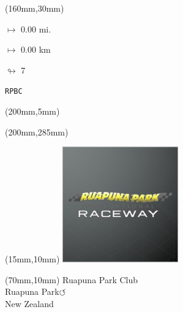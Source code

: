 \begin{textblock*}{40mm}(160mm,30mm)%
\Large
\par$\mapsto$ 0.00 mi.
\par$\mapsto$ 0.00 km
\par$\looparrowright$ 7
\par\hfill\tiny\tt RPBC\\
\end{textblock*}
\begin{textblock*}{20mm}(200mm,5mm)%
\fbox{\thepage}
\label{RPBC}
\end{textblock*}
\begin{textblock*}{20mm}(200mm,285mm)%
\fbox{\thepage}
\end{textblock*}

\null\newpage
\begin{textblock*}{50mm}(15mm,10mm)%
\includegraphics[width=50mm]{LG/RUPU.png}
\end{textblock*}
\begin{textblock*}{130mm}(70mm,10mm)%
{\fontsize{20}{20}\selectfont Ruapuna Park Club\\}
{\fontsize{16}{16}\selectfont Ruapuna Park\hfill \huge$\circlearrowleft$\\}
{\fontsize{12}{12}\selectfont New Zealand\\}
\end{textblock*}
